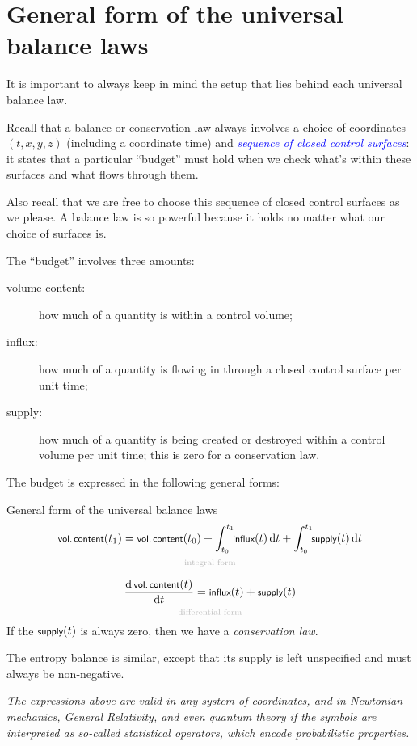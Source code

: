 \documentclass[a4paper,12pt,%
onecolumn,oneside,%
british%
]{memoir}
\newcommand*{\di}{\mathrm{d}}%
\renewcommand*{\|}[1][]{\nonscript\:#1\vert\nonscript\:\mathopen{}}
\newcommand*{\sect}{\S}%
\renewcommand*{\autoref}[2]{\sidepar{\vspace{-1ex}\footnotesize{\color{blue}\faIcon{%
angle-right%
}\enspace\sect~\ref{#1} page~\pageref{#1}}}\textcolor{blue}{#2}}
\newcommand*{\yti}{t_{0}}
\newcommand*{\ytf}{t_{1}}
\begin{document}
\section{General form of the universal balance laws}
\label{sec:common_formulation}

It is important to always keep in mind the setup that lies behind each universal balance law.

Recall that a balance or conservation law always involves a choice of coordinates $(t,x,y,z)$ (including a coordinate time) and \autoref{sec:conservation_laws}{\emph{sequence of closed control surfaces}}: it states that a particular \enquote{budget} must hold when we check what's within these surfaces and what flows through them.

Also recall that we are free to choose this sequence of closed control surfaces as we please. A balance law is so powerful because it holds no matter what our choice of surfaces is.

The \enquote{budget} involves three amounts:
\begin{description}
\item[volume content:] how much of a quantity is within a control volume;
\item[influx:] how much of a quantity is flowing in through a closed control surface per unit time;
\item[supply:] how much of a quantity is being created or destroyed within a control volume per unit time; this is zero for a conservation law.
\end{description}

The budget is expressed in the following general forms:
\begin{definition}{General form of the universal balance laws}
  \begin{equation*}
    \begin{gathered}[t]
      \underbracket[0pt]{\textsf{\footnotesize vol.\,content}(\ytf) = \textsf{\footnotesize vol.\,content}(\yti) + \int_{\yti}^{\ytf}\!\!\textsf{\footnotesize influx}(t)\,\di t + \int_{\yti}^{\ytf}\!\!\textsf{\footnotesize supply}(t)\,\di t}_{\mathclap{\text{\color{grey}integral form}}}
      \\[2\jot]
      \underbracket[0pt]{\frac{\di\,\textsf{\footnotesize vol.\,content}(t)}{\di t} = \textsf{\footnotesize influx}(t) + \textsf{\footnotesize supply}(t)}_{\mathclap{\text{\color{grey}differential form}}}
    \end{gathered}
  \end{equation*}
  If the $\textsf{\footnotesize supply}(t)$ is always zero, then we have a \emph{conservation law}.

  \medskip

    The entropy balance is similar, except that its supply is left unspecified and must always be non-negative.

      \medskip

  \emph{The expressions above are valid in any system of coordinates, and in Newtonian mechanics, General Relativity, and even quantum theory if the symbols are interpreted as so-called statistical operators, which encode probabilistic properties.}
\end{definition}
\end{document}
